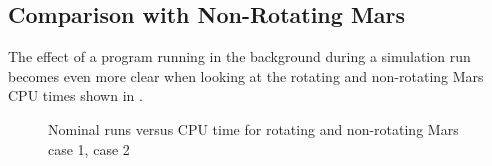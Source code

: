 %



\subsection{Comparison with Non-Rotating Mars}
\label{subsec:timeCompNotRot}
The effect of a program running in the background during a simulation run becomes even more clear when looking at the rotating and non-rotating Mars CPU times shown in . 


%
%


\begin{figure}[H]
\centering
{} 
\caption{Nominal runs versus CPU time for rotating and non-rotating Mars \protect{} case 1,  \protect{} case 2 } 
\label{fig:multiRunVsCPUcase1combinedSmall} 
\end{figure} 

